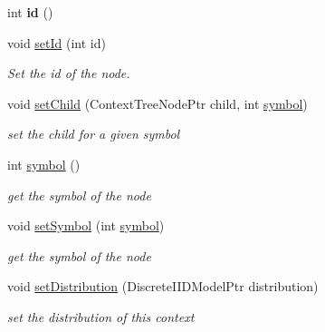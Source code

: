 \begin{DoxyCompactItemize}
int {\bfseries id} ()
\item 
\mbox{\label{classtops_1_1ContextTreeNode_a6990cbe644cba6b5d04c72caa1c20bb0}} 
void \hyperlink{classtops_1_1ContextTreeNode_a6990cbe644cba6b5d04c72caa1c20bb0}{set\+Id} (int id)
\begin{DoxyCompactList}\small\item\em Set the id of the node. \end{DoxyCompactList}\item 
\mbox{\label{classtops_1_1ContextTreeNode_a5e23540b51f90a50c42bc09f7b0b01ec}} 
void \hyperlink{classtops_1_1ContextTreeNode_a5e23540b51f90a50c42bc09f7b0b01ec}{set\+Child} (Context\+Tree\+Node\+Ptr child, int \hyperlink{classtops_1_1ContextTreeNode_abda55f9f7239d05edc4e41e3bae092bd}{symbol})
\begin{DoxyCompactList}\small\item\em set the child for a given symbol \end{DoxyCompactList}\item 
\mbox{\label{classtops_1_1ContextTreeNode_abda55f9f7239d05edc4e41e3bae092bd}} 
int \hyperlink{classtops_1_1ContextTreeNode_abda55f9f7239d05edc4e41e3bae092bd}{symbol} ()
\begin{DoxyCompactList}\small\item\em get the symbol of the node \end{DoxyCompactList}\item 
\mbox{\label{classtops_1_1ContextTreeNode_a59632e74e2a8d693e5182c1813c75bbc}} 
void \hyperlink{classtops_1_1ContextTreeNode_a59632e74e2a8d693e5182c1813c75bbc}{set\+Symbol} (int \hyperlink{classtops_1_1ContextTreeNode_abda55f9f7239d05edc4e41e3bae092bd}{symbol})
\begin{DoxyCompactList}\small\item\em get the symbol of the node \end{DoxyCompactList}\item 
\mbox{\label{classtops_1_1ContextTreeNode_a4812bc6482d8ae0f4b2f1bc32638f711}} 
void \hyperlink{classtops_1_1ContextTreeNode_a4812bc6482d8ae0f4b2f1bc32638f711}{set\+Distribution} (Discrete\+I\+I\+D\+Model\+Ptr distribution)
\begin{DoxyCompactList}\small\item\em set the distribution of this context \end{DoxyCompactList}\item 

\end{DoxyCompactItemize}
